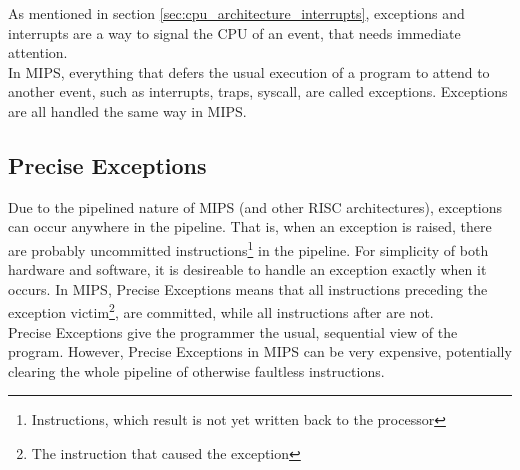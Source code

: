 As mentioned in section \ref{sec:cpu_architecture_interrupts}, exceptions and
interrupts are a way to signal the CPU of an event, that needs immediate
attention.\\
In MIPS, everything that defers the usual execution of a program to attend to
another event, such as interrupts, traps, syscall, are called exceptions\cite{see_mips_run}.
Exceptions are all handled the same way in MIPS.

\subsection{Precise Exceptions}
Due to the pipelined nature of MIPS (and other RISC architectures), exceptions
can occur anywhere in the pipeline. That is, when an exception is raised, there
are probably uncommitted instructions\footnote{Instructions, which result is not
yet written back to the processor} in the pipeline. For simplicity of both hardware and
software, it is desireable to handle an exception exactly when it occurs. In
MIPS, Precise Exceptions means that all instructions preceding the exception
victim\footnote{The instruction that caused the exception}, are committed, while
all instructions after are not.\\
Precise Exceptions give the programmer the usual, sequential view of the
program. However, Precise Exceptions in MIPS can be very expensive, potentially
clearing the whole pipeline of otherwise faultless instructions.

